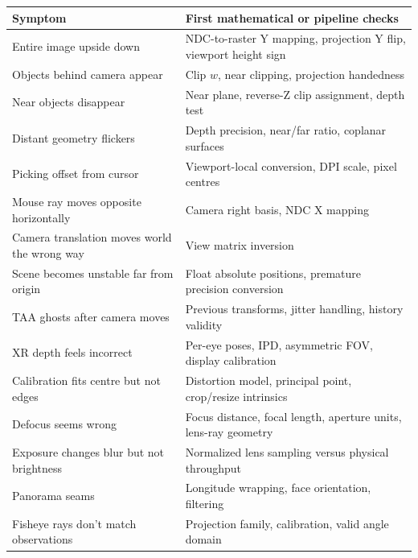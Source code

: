 {\def\LTcaptype{none} %
\begin{longtable}[]{@{}
  >{\raggedright\arraybackslash}p{}
  >{\raggedright\arraybackslash}p{}@{}}
\toprule\noalign{}
\begin{minipage}[b]{\linewidth}\raggedright
Symptom
\end{minipage} & \begin{minipage}[b]{\linewidth}\raggedright
First mathematical or pipeline checks
\end{minipage} \\
\midrule\noalign{}
\endhead
\bottomrule\noalign{}
\endlastfoot
Entire image upside down & NDC-to-raster Y mapping, projection Y flip, viewport height sign \\
Objects behind camera appear & Clip \(w\), near clipping, projection handedness \\
Near objects disappear & Near plane, reverse-Z clip assignment, depth test \\
Distant geometry flickers & Depth precision, near/far ratio, coplanar surfaces \\
Picking offset from cursor & Viewport-local conversion, DPI scale, pixel centres \\
Mouse ray moves opposite horizontally & Camera right basis, NDC X mapping \\
Camera translation moves world the wrong way & View matrix inversion \\
Scene becomes unstable far from origin & Float absolute positions, premature precision conversion \\
TAA ghosts after camera moves & Previous transforms, jitter handling, history validity \\
XR depth feels incorrect & Per-eye poses, IPD, asymmetric FOV, display calibration \\
Calibration fits centre but not edges & Distortion model, principal point, crop/resize intrinsics \\
Defocus seems wrong & Focus distance, focal length, aperture units, lens-ray geometry \\
Exposure changes blur but not brightness & Normalized lens sampling versus physical throughput \\
Panorama seams & Longitude wrapping, face orientation, filtering \\
Fisheye rays don't match observations & Projection family, calibration, valid angle domain \\
\end{longtable}
}

